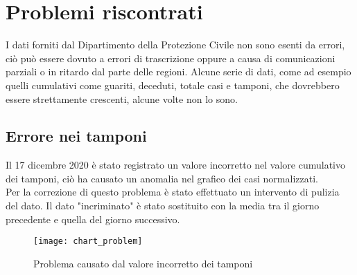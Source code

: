 \section{Problemi riscontrati}
I dati forniti dal Dipartimento della Protezione Civile non sono esenti da errori, ciò può essere dovuto a errori di trascrizione oppure a causa di comunicazioni parziali o in ritardo dal parte delle regioni.
Alcune serie di dati, come ad esempio quelli cumulativi come guariti, deceduti, totale casi e tamponi, che dovrebbero essere strettamente crescenti, alcune volte non lo sono.

\subsection{Errore nei tamponi}
Il 17 dicembre 2020 è stato registrato un valore incorretto nel valore cumulativo dei tamponi, ciò ha causato un anomalia nel grafico dei casi normalizzati.\\
Per la correzione di questo problema è stato effettuato un intervento di pulizia del dato.
Il dato "incriminato" è stato sostituito con la media tra il giorno precedente e quella del giorno successivo.
\begin{figure}[htp]
    \centering
    \texttt{[image: chart\_problem]}
    \caption{Problema causato dal valore incorretto dei tamponi}
\end{figure}


